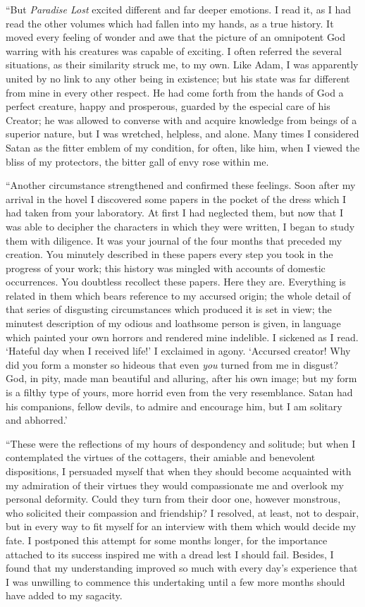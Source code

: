 \documentclass[12pt,openright]{book}
\begin{document}
“But \textit{Paradise Lost} excited different and far deeper emotions. I read it, as I had read the other volumes which had fallen into my hands, as a true history. It moved every feeling of wonder and awe that the picture of an omnipotent God warring with his creatures was capable of exciting. I often referred the several situations, as their similarity struck me, to my own. Like Adam, I was apparently united by no link to any other being in existence; but his state was far different from mine in every other respect. He had come forth from the hands of God a perfect creature, happy and prosperous, guarded by the especial care of his Creator; he was allowed to converse with and acquire knowledge from beings of a superior nature, but I was wretched, helpless, and alone. Many times I considered Satan as the fitter emblem of my condition, for often, like him, when I viewed the bliss of my protectors, the bitter gall of envy rose within me.

“Another circumstance strengthened and confirmed these feelings. Soon after my arrival in the hovel I discovered some papers in the pocket of the dress which I had taken from your laboratory. At first I had neglected them, but now that I was able to decipher the characters in which they were written, I began to study them with diligence. It was your journal of the four months that preceded my creation. You minutely described in these papers every step you took in the progress of your work; this history was mingled with accounts of domestic occurrences. You doubtless recollect these papers. Here they are. Everything is related in them which bears reference to my accursed origin; the whole detail of that series of disgusting circumstances which produced it is set in view; the minutest description of my odious and loathsome person is given, in language which painted your own horrors and rendered mine indelible. I sickened as I read. ‘Hateful day when I received life!’ I exclaimed in agony. ‘Accursed creator! Why did you form a monster so hideous that even \textit{you} turned from me in disgust? God, in pity, made man beautiful and alluring, after his own image; but my form is a filthy type of yours, more horrid even from the very resemblance. Satan had his companions, fellow devils, to admire and encourage him, but I am solitary and abhorred.’

“These were the reflections of my hours of despondency and solitude; but when I contemplated the virtues of the cottagers, their amiable and benevolent dispositions, I persuaded myself that when they should become acquainted with my admiration of their virtues they would compassionate me and overlook my personal deformity. Could they turn from their door one, however monstrous, who solicited their compassion and friendship? I resolved, at least, not to despair, but in every way to fit myself for an interview with them which would decide my fate. I postponed this attempt for some months longer, for the importance attached to its success inspired me with a dread lest I should fail. Besides, I found that my understanding improved so much with every day’s experience that I was unwilling to commence this undertaking until a few more months should have added to my sagacity.
\end{document}
